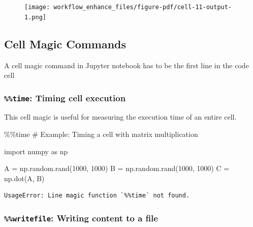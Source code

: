 \documentclass[
  letterpaper,
  DIV=11,
  numbers=noendperiod]{scrreprt}
\newenvironment{Shaded}{\begin{snugshade}}{\end{snugshade}}
\newcommand{\CommentTok}[1]{\textcolor[rgb]{0.37,0.37,0.37}{#1}}
\newcommand{\DecValTok}[1]{\textcolor[rgb]{0.68,0.00,0.00}{#1}}
\newcommand{\ImportTok}[1]{\textcolor[rgb]{0.00,0.46,0.62}{#1}}
\newcommand{\NormalTok}[1]{\textcolor[rgb]{0.00,0.23,0.31}{#1}}
\newcommand{\OperatorTok}[1]{\textcolor[rgb]{0.37,0.37,0.37}{#1}}
\begin{document}
\begin{figure}[H]

{\centering \texttt{[image: workflow\_enhance\_files/figure-pdf/cell-11-output-1.png]}

}

\end{figure}

\hypertarget{cell-magic-commands}{%
\subsection{Cell Magic Commands}\label{cell-magic-commands}}

A cell magic command in Jupyter notebook has to be the first line in the
code cell

\hypertarget{time-timing-cell-execution}{%
\subsubsection{\texorpdfstring{\texttt{\%\%time}: Timing cell
execution}{\%\%time: Timing cell execution}}\label{time-timing-cell-execution}}

This cell magic is useful for measuring the execution time of an entire
cell.

\begin{Shaded}
\begin{Highlighting}[]
\OperatorTok{\%\%}\NormalTok{time}
\CommentTok{\# Example: Timing a cell with matrix multiplication}

\ImportTok{import}\NormalTok{ numpy }\ImportTok{as}\NormalTok{ np}

\NormalTok{A }\OperatorTok{=}\NormalTok{ np.random.rand(}\DecValTok{1000}\NormalTok{, }\DecValTok{1000}\NormalTok{)}
\NormalTok{B }\OperatorTok{=}\NormalTok{ np.random.rand(}\DecValTok{1000}\NormalTok{, }\DecValTok{1000}\NormalTok{)}
\NormalTok{C }\OperatorTok{=}\NormalTok{ np.dot(A, B)}
\end{Highlighting}
\end{Shaded}

\begin{verbatim}
UsageError: Line magic function `%%time` not found.
\end{verbatim}

\hypertarget{writefile-writing-content-to-a-file}{%
\subsubsection{\texorpdfstring{\texttt{\%\%writefile}: Writing content
to a
file}{\%\%writefile: Writing content to a file}}\label{writefile-writing-content-to-a-file}}
\end{document}
